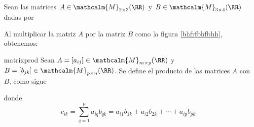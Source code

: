 \begin{examplebox}{}{}
    Sean las matrices $A \in \mathcalm{M}_{2 \times 3}(\RR)$ y $B \in \mathcalm{M}_{3 \times 4}(\RR)$ dadas por
    \begin{matrizn}
    \end{matrizn}
    Al multiplicar la matriz $A$ por la matriz $B$ como la figura \ref{bhfrfbhfbhh}, obtenemos:
    \begin{matrizn}
    \end{matrizn}
\end{examplebox}

\begin{definicion}{}{matrixprod}
    Sean $A = [ a_{ij} ] \in \mathcalm{M}_{m \times p}(\RR)$ y $B = [ b_{jk} ] \in \mathcalm{M}_{p \times n}(\RR)$. Se define el producto de las matrices $A$ con $B$, como sigue
    \begin{matrizn}
    \end{matrizn}
    donde
    \begin{equation}
        c_{ik} = \sum_{q=1}^{p} a_{iq}b_{qk} = a_{i1}b_{1k} + a_{i2}b_{2k} + \cdots + a_{ip}b_{pk} \label{eqcusjahha}
    \end{equation}
\end{definicion}

